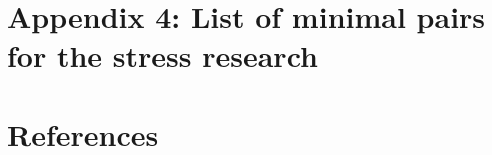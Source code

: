 \documentclass[
]{article}
\begin{document}
\pagebreak

\hypertarget{appendix-4-list-of-minimal-pairs-for-the-stress-research}{%
\section*{Appendix 4: List of minimal pairs for the stress
research}\label{appendix-4-list-of-minimal-pairs-for-the-stress-research}}

\pagebreak

\hypertarget{references}{%
\section*{References}\label{references}}
\end{document}
